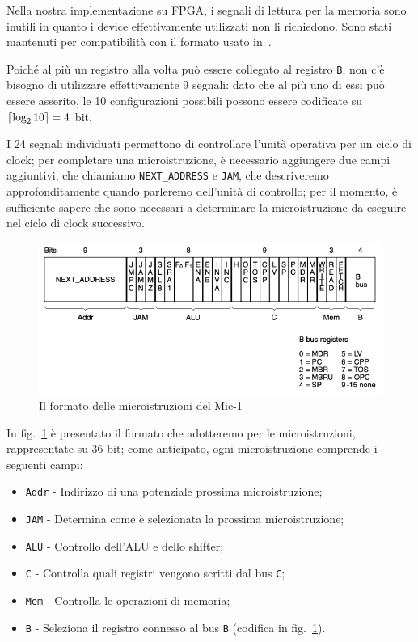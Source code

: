 \documentclass[a4paper,12pt]{scrreprt}
\DeclarePairedDelimiter{\ceil}{\lceil}{\rceil}
\begin{document}
\begin{mynote}{}{}
  Nella nostra implementazione su FPGA, i segnali di lettura per la memoria sono
  inutili in quanto i device effettivamente utilizzati non li richiedono. Sono
  stati mantenuti per compatibilità con il formato usato in~\cite{tanenbaum}.
\end{mynote}

Poiché al più un registro alla volta può essere collegato al registro
\lstinline{B}, non c'è bisogno di utilizzare effettivamente 9 segnali: dato che
al più uno di essi può essere asserito, le 10 configurazioni possibili possono
essere codificate su $\ceil{\log_{2}10} = 4$ bit.

I 24 segnali individuati permettono di controllare l'unità operativa per un
ciclo di clock; per completare una microistruzione, è necessario aggiungere due
campi aggiuntivi, che chiamiamo \lstinline{NEXT_ADDRESS} e \lstinline{JAM}, che
descriveremo approfonditamente quando parleremo dell'unità di controllo; per il
momento, è sufficiente sapere che sono necessari a determinare la
microistruzione da eseguire nel ciclo di clock successivo.

\begin{figure}
  \centering
  \includegraphics[width=\textwidth]{mu_instr.png}
  \caption{Il formato delle microistruzioni del Mic-1}\label{fig:mu_instr}
\end{figure}

In fig.~\ref{fig:mu_instr} è presentato il formato che adotteremo per le
microistruzioni, rappresentate su 36 bit; come anticipato, ogni microistruzione
comprende i seguenti campi:
\begin{itemize}
  \item \lstinline{Addr} - Indirizzo di una potenziale prossima microistruzione;
  \item \lstinline{JAM} - Determina come è selezionata la prossima
  microistruzione;
  \item \lstinline{ALU} - Controllo dell'ALU e dello shifter;
  \item \lstinline{C} - Controlla quali registri vengono scritti dal bus
  \lstinline{C};
  \item \lstinline{Mem} - Controlla le operazioni di memoria;
  \item \lstinline{B} - Seleziona il registro connesso al bus \lstinline{B}
  (codifica in fig.~\ref{fig:mu_instr}).
\end{itemize}
\end{document}
